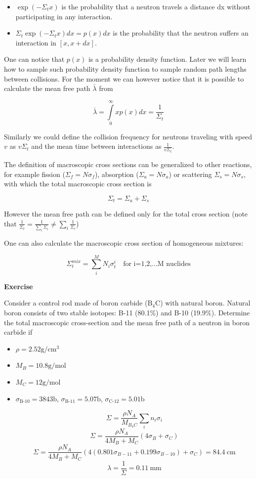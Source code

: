\begin{itemize}
\item $\exp(-\Sigma_t x)$ is the probability that a neutron travels a distance dx without participating in any interaction.
\item $\Sigma_t \exp(-\Sigma_t x)dx=p(x)dx$ is the probability that the neutron suffers an interaction in $[x,x+dx]$.
\end{itemize}

One can notice that $p(x)$ is a probability density function. Later we will learn how to sample such probability density function to sample random path lengths between collisions. For the moment we can however notice that it is possible to calculate the mean free path $\bar\lambda$ from

\[
\bar\lambda=\int\limits_0^\infty xp(x)dx=\frac{1}{\Sigma_t}
\]

Similarly we could define the collision frequency for neutrons traveling with speed $v$ as $v\Sigma_t$ and the mean time between interactions as $\frac{1}{v\Sigma_t}$.

The definition of macroscopic cross sections can be generalized to other reactions, for example fission ($\Sigma_f=N\sigma_f$), absorption ($\Sigma_a=N\sigma_a$) or scattering $\Sigma_s=N\sigma_s$, with which the total macroscopic cross section is

\[
\Sigma_t=\Sigma_a+\Sigma_s
\]

However the mean free path can be defined only for the total cross section (note that $\frac{1}{\Sigma_t} = \frac{1}{\sum\limits_i \Sigma_i}\neq \sum\limits_i\frac{1}{\Sigma_i}$)

One can also calculate the macroscopic cross section of homogeneous mixtures:

\[
\Sigma_t^{mix}=\sum\limits_i^M N_i\sigma_t^i \quad \text{for i=1,2,...M nuclides}
\]

\begin{tcolorbox}
\textbf{Exercise}

Consider a control rod made of boron carbide ($\text{B}_4\text{C}$) with natural boron. Natural boron consists of two stable isotopes: B-11 (80.1\%) and B-10 (19.9\%). Determine the total macroscopic cross-section and the mean free path of a neutron in boron carbide if
\begin{itemize}
\item $\rho = 2.52\text{g}/\text{cm}^3$
\item $M_B = 10.8\text{g}/\text{mol}$
\item $M_C = 12\text{g}/\text{mol}$
\item $\sigma_{\text{B-10}}=3843 \text{b}$, $\sigma_{\text{B-11}}=5.07 \text{b}$, $\sigma_{\text{C-12}}=5.01 \text{b}$

$$\Sigma=\frac{\rho N_A}{M_{B_4C}}\sum_in_i\sigma_i$$
$$\Sigma=\frac{\rho N_A}{4M_{B}+M_{C}}(4\sigma_B+\sigma_C)$$
$$\Sigma=\frac{\rho N_A}{4M_{B}+M_{C}}(4(0.801\sigma_{B-11}+0.199\sigma_{B-10})+\sigma_C)=84.4 \: \text{cm}$$
$$\lambda=\frac{1}{\Sigma}=0.11\:\text{mm}$$
\end{itemize}
 \end{tcolorbox}

